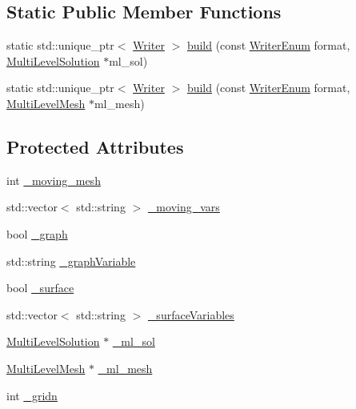 \subsection*{Static Public Member Functions}
\begin{DoxyCompactItemize}
\item 
static std\+::unique\+\_\+ptr$<$ \mbox{\hyperlink{classfemus_1_1_writer}{Writer}} $>$ \mbox{\hyperlink{classfemus_1_1_writer_a97628f939955d426bf70b0d3d016705b}{build}} (const \mbox{\hyperlink{_writer_enum_8hpp_a18b827c3c1f62b8a57febdcad0c871a8}{Writer\+Enum}} format, \mbox{\hyperlink{classfemus_1_1_multi_level_solution}{Multi\+Level\+Solution}} $\ast$ml\+\_\+sol)
\item 
static std\+::unique\+\_\+ptr$<$ \mbox{\hyperlink{classfemus_1_1_writer}{Writer}} $>$ \mbox{\hyperlink{classfemus_1_1_writer_a0728978c3531becf7e0cedac9a8b9d9a}{build}} (const \mbox{\hyperlink{_writer_enum_8hpp_a18b827c3c1f62b8a57febdcad0c871a8}{Writer\+Enum}} format, \mbox{\hyperlink{classfemus_1_1_multi_level_mesh}{Multi\+Level\+Mesh}} $\ast$ml\+\_\+mesh)
\end{DoxyCompactItemize}
\subsection*{Protected Attributes}
\begin{DoxyCompactItemize}
\item 
int \mbox{\hyperlink{classfemus_1_1_writer_a9b978d0a462fc50e1ffb024bd17c63fc}{\+\_\+moving\+\_\+mesh}}
\item 
std\+::vector$<$ std\+::string $>$ \mbox{\hyperlink{classfemus_1_1_writer_ae0ba1963fd2a1e3ffcbd71a09942f11a}{\+\_\+moving\+\_\+vars}}
\item 
bool \mbox{\hyperlink{classfemus_1_1_writer_a51798fe762bd3fe7f03de89fcd689c9f}{\+\_\+graph}}
\item 
std\+::string \mbox{\hyperlink{classfemus_1_1_writer_abc4c8bb583c18bd90d006d01fcb448a1}{\+\_\+graph\+Variable}}
\item 
bool \mbox{\hyperlink{classfemus_1_1_writer_a3e1fd7a51767d72170fe212e1bff987b}{\+\_\+surface}}
\item 
std\+::vector$<$ std\+::string $>$ \mbox{\hyperlink{classfemus_1_1_writer_af5ef992bc65e74345dded38b976b144c}{\+\_\+surface\+Variables}}
\item 
\mbox{\hyperlink{classfemus_1_1_multi_level_solution}{Multi\+Level\+Solution}} $\ast$ \mbox{\hyperlink{classfemus_1_1_writer_a980ede81568e7ff655ee380e92d3a57a}{\+\_\+ml\+\_\+sol}}
\item 
\mbox{\hyperlink{classfemus_1_1_multi_level_mesh}{Multi\+Level\+Mesh}} $\ast$ \mbox{\hyperlink{classfemus_1_1_writer_afbf272e5db3b204bb2c4679d19096688}{\+\_\+ml\+\_\+mesh}}
\item 
int \mbox{\hyperlink{classfemus_1_1_writer_ad9e4841295416233d0943775111fc1d3}{\+\_\+gridn}}
\end{DoxyCompactItemize}
